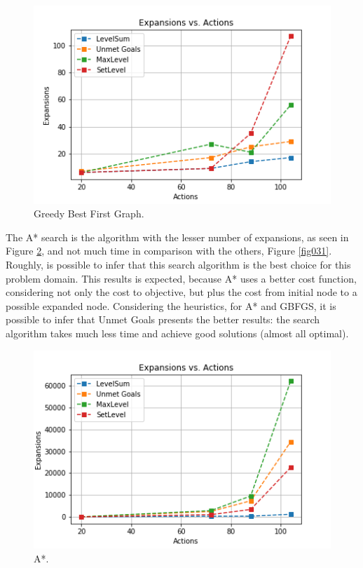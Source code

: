 \documentclass[a4paper]{article}
\begin{document}
\begin{figure}[htpb]
\begin{center}
\includegraphics[width=1\columnwidth]{fig/results_134.png}
\end{center}
\caption{Greedy Best First Graph.}
\label{fig134}
\end{figure}

The A* search is the algorithm with the lesser number of expansions, as seen in Figure \ref{fig034}, and not much time in comparison with the others, Figure \ref{fig031}. Roughly, is possible to infer that this search algorithm is the best choice for this problem domain. This results is expected, because A* uses a better cost function, considering not only the cost to objective, but plus the cost from initial node to a possible expanded node. Considering the heuristics, for A* and GBFGS, it is possible to infer that Unmet Goals presents the better results: the search algorithm takes much less time and achieve good solutions (almost all optimal). 

\begin{figure}[htpb]
\begin{center}
\includegraphics[width=1\columnwidth]{fig/results_034.png}
\end{center}
\caption{A*.}
\label{fig034}
\end{figure}
        
\end{document}
